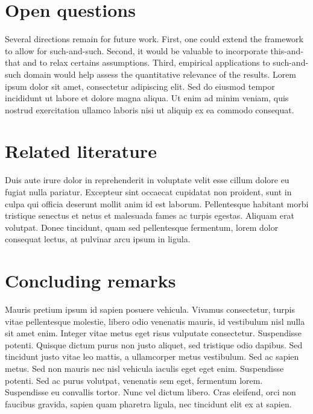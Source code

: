 
\section{Open questions}

Several directions remain for future work. First, one could extend the framework to allow for such-and-such. Second, it would be valuable to incorporate this-and-that and to relax certains assumptions. Third, empirical applications to such-and-such domain would help assess the quantitative relevance of the results. Lorem ipsum dolor sit amet, consectetur adipiscing elit. Sed do eiusmod tempor incididunt ut labore et dolore magna aliqua. Ut enim ad minim veniam, quis nostrud exercitation ullamco laboris nisi ut aliquip ex ea commodo consequat.

\section{Related literature}

Duis aute irure dolor in reprehenderit in voluptate velit esse cillum dolore eu fugiat nulla pariatur. Excepteur sint occaecat cupidatat non proident, sunt in culpa qui officia deserunt mollit anim id est laborum. Pellentesque habitant morbi tristique senectus et netus et malesuada fames ac turpis egestas. Aliquam erat volutpat. Donec tincidunt, quam sed pellentesque fermentum, lorem dolor consequat lectus, at pulvinar arcu ipsum in ligula.

\section{Concluding remarks}

Mauris pretium ipsum id sapien posuere vehicula. Vivamus consectetur, turpis vitae pellentesque molestie, libero odio venenatis mauris, id vestibulum nisl nulla sit amet enim. Integer vitae metus eget risus vulputate consectetur. Suspendisse potenti. Quisque dictum purus non justo aliquet, sed tristique odio dapibus. Sed tincidunt justo vitae leo mattis, a ullamcorper metus vestibulum. Sed ac sapien metus. Sed non mauris nec nisl vehicula iaculis eget eget enim. Suspendisse potenti. Sed ac purus volutpat, venenatis sem eget, fermentum lorem. Suspendisse eu convallis tortor. Nunc vel dictum libero. Cras eleifend, orci non faucibus gravida, sapien quam pharetra ligula, nec tincidunt elit ex at sapien.
